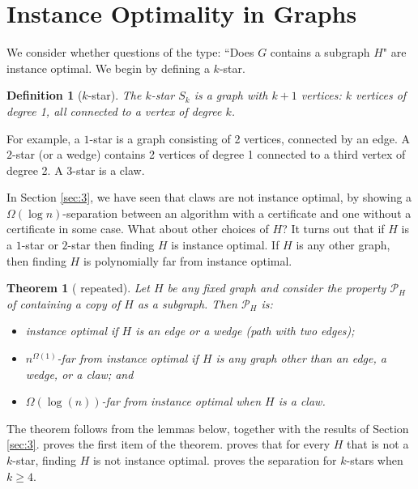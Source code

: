 \documentclass[11pt]{article}
\numberwithin{equation}{section}
\newtheorem{theorem}{Theorem}[section]
\newtheorem{definition}[definition]{Definition}
\newcommand{\kstar}[1]{\ensuremath{#1}-star}
\newcommand{\1}{\mathbf{1}}
\begin{document}
 \section{Instance Optimality in Graphs} \label{sec:5}



We consider whether questions of the type: ``Does $G$ contains a subgraph $H$" are instance optimal.
 We begin by defining a \kstar{k}.
 
 \begin{definition} [\kstar{k}]
The \emph{\kstar{k}} $S_k$ is a graph with $k+1$ vertices: $k$ vertices of degree 1, all connected to a vertex of degree $k$.
 \end{definition}
 
  For example, a \kstar{1} is a graph consisting of 2 vertices, connected by an edge. A \kstar{2} (or a wedge) contains 2 vertices of degree 1 connected to a third vertex of degree 2. A \kstar{3} is a claw. 





 In Section \ref{sec:3}, we have seen that claws are not instance optimal, by showing a $\Omega(\log n)$-separation between an algorithm with a certificate and one without a certificate in some case. What about other choices of $H$? It turns out that if $H$ is a \kstar{1} or \kstar{2} then finding $H$ is instance optimal. If $H$ is any other graph, then finding $H$ is polynomially far from instance optimal. 







\begin{theorem}[ repeated]
Let $H$ be any fixed graph and consider the property $\mathcal{P}_H$ of containing a copy of $H$ as a subgraph. Then $\mathcal{P}_H$ is:
\begin{itemize}
\item instance optimal if $H$ is an edge or a wedge (path with two edges);
\item $n^{\Omega(1)}$-far from instance optimal if $H$ is any graph other than an edge, a wedge, or a claw; and
\item $\Omega(\log(n))$-far from instance optimal when $H$ is a claw.
  \end{itemize}
\end{theorem}



The theorem follows from the lemmas below, together with the results of Section \ref{sec:3}.  proves the first item of the theorem. 
 proves that for every $H$ that is not a \kstar{k}, finding $H$ is not instance optimal.  proves the separation for $k$-stars when $k \geq 4$. 
\end{document}
